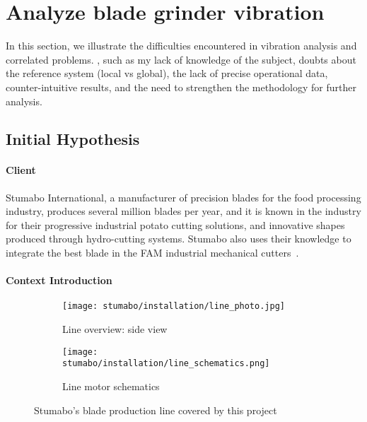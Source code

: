 
\section{Analyze blade grinder vibration}


In this section,
we illustrate
% 
the difficulties encountered in vibration analysis and correlated problems.
, such as my lack of knowledge of the subject, 
doubts about the reference system (local vs global),
the lack of precise operational data, counter-intuitive results, and the need to strengthen the methodology for further analysis.


\subsection{Initial Hypothesis}
\paragraph{Client} Stumabo International, a manufacturer of precision blades for the food processing industry, produces several million blades per year, 
and it is known in the industry for their progressive industrial potato cutting solutions, and innovative shapes produced through hydro-cutting systems.
Stumabo also uses their knowledge to integrate the best blade in the FAM industrial mechanical cutters~\cite{Misc:stumabo_en_website}.

\paragraph{Context Introduction}
\begin{figure}[ht]
    \begin{subfigure}{\textwidth}
        \texttt{[image: stumabo/installation/line\_photo.jpg]}
        \caption{Line overview: side view}
        \label{fig:line_overview}
    \end{subfigure}
    \begin{subfigure}{\textwidth}
        \texttt{[image: stumabo/installation/line\_schematics.png]}
        \caption{Line motor schematics}
        \label{fig:line_schematics}
    \end{subfigure}
    \caption{Stumabo's blade production line covered by this project}
    \label{fig:stumabo_prod_line}
\end{figure}


